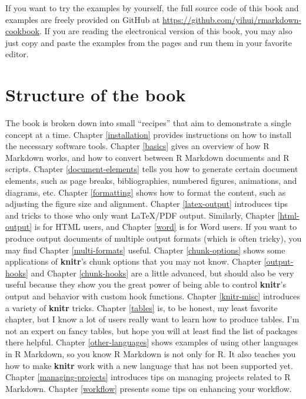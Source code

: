 \documentclass[
  11pt,
]{krantz}
\begin{document}
If you want to try the examples by yourself, the full source code of this book and examples are freely provided on GitHub at \url{https://github.com/yihui/rmarkdown-cookbook}. If you are reading the electronical version of this book, you may also just copy and paste the examples from the pages and run them in your favorite editor.

\hypertarget{structure-of-the-book}{%
\section*{Structure of the book}\label{structure-of-the-book}}


The book is broken down into small ``recipes'' that aim to demonstrate a single concept at a time. Chapter \ref{installation} provides instructions on how to install the necessary software tools. Chapter \ref{basics} gives an overview of how R Markdown works, and how to convert between R Markdown documents and R scripts. Chapter \ref{document-elements} tells you how to generate certain document elements, such as page breaks, bibliographies, numbered figures, animations, and diagrams, etc. Chapter \ref{formatting} shows how to format the content, such as adjusting the figure size and alignment. Chapter \ref{latex-output} introduces tips and tricks to those who only want LaTeX/PDF output. Similarly, Chapter \ref{html-output} is for HTML users, and Chapter \ref{word} is for Word users. If you want to produce output documents of multiple output formats (which is often tricky), you may find Chapter \ref{multi-formats} useful. Chapter \ref{chunk-options} shows some applications of \textbf{knitr}'s chunk options that you may not know. Chapter \ref{output-hooks} and Chapter \ref{chunk-hooks} are a little advanced, but should also be very useful because they show you the great power of being able to control \textbf{knitr}'s output and behavior with custom hook functions. Chapter \ref{knitr-misc} introduces a variety of \textbf{knitr} tricks. Chapter \ref{tables} is, to be honest, my least favorite chapter, but I know a lot of users really want to learn how to produce tables. I'm not an expert on fancy tables, but hope you will at least find the list of packages there helpful. Chapter \ref{other-languages} shows examples of using other languages in R Markdown, so you know R Markdown is not only for R. It also teaches you how to make \textbf{knitr} work with a new language that has not been supported yet. Chapter \ref{managing-projects} introduces tips on managing projects related to R Markdown. Chapter \ref{workflow} presents some tips on enhancing your workflow.
\end{document}
